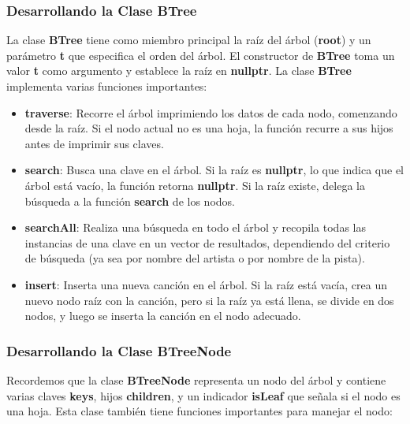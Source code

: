 \documentclass[corference]{IEEEtran}
\begin{document}
\begin{flushleft}
            \subsubsection{Desarrollando la Clase BTree }
            
                \noindent\hspace{4em}La clase \textbf{BTree} tiene como miembro principal la raíz del árbol (\textbf{root}) y un parámetro \textbf{t} que especifica el orden del árbol. El constructor de \textbf{BTree} toma un valor \textbf{t} como argumento y establece la raíz en \textbf{nullptr}. La clase \textbf{BTree} implementa varias funciones importantes:
                
                \begin{itemize}[left=4em]
                    \item \textbf{traverse}: Recorre el árbol imprimiendo los datos de cada nodo, comenzando desde la raíz. Si el nodo actual no es una hoja, la función recurre a sus hijos antes de imprimir sus claves.
                    \item \textbf{search}: Busca una clave en el árbol. Si la raíz es \textbf{nullptr}, lo que indica que el árbol está vacío, la función retorna \textbf{nullptr}. Si la raíz existe, delega la búsqueda a la función \textbf{search} de los nodos.
                    \item \textbf{searchAll}: Realiza una búsqueda en todo el árbol y recopila todas las instancias de una clave en un vector de resultados, dependiendo del criterio de búsqueda (ya sea por nombre del artista o por nombre de la pista).
                    \item \textbf{insert}: Inserta una nueva canción en el árbol. Si la raíz está vacía, crea un nuevo nodo raíz con la canción, pero si la raíz ya está llena, se divide en dos nodos, y luego se inserta la canción en el nodo adecuado.
                \end{itemize}
            
            \subsubsection{Desarrollando la Clase BTreeNode}
                
                \noindent\hspace{4em}Recordemos que la clase \textbf{BTreeNode} representa un nodo del árbol y contiene varias claves \textbf{keys}, hijos \textbf{children}, y un indicador \textbf{isLeaf} que señala si el nodo es una hoja. Esta clase también tiene funciones importantes para manejar el nodo:
                

\end{flushleft}
\end{document}
